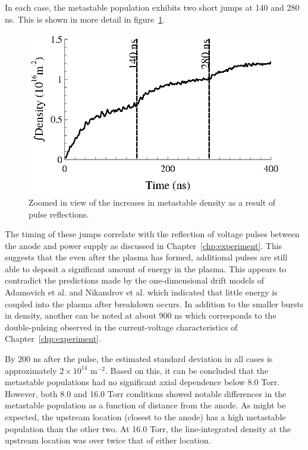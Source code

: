 In each case, the metastable population exhibits two short jumps at 140 and 280
ns. This is shown in more detail in figure~\ref{fig:mzoomed}.
\begin{figure}
  \centering
  \includegraphics{./chapters/metastables/figures/mzoomed.eps}
  \caption{Zoomed in view of the increases in metastable density as a result of
    pulse reflections.}
  \label{fig:mzoomed}
\end{figure}
The timing of these jumps correlate with the reflection of voltage pulses
between the anode and power supply as discussed in Chapter~\ref{chp:experiment}.
This suggests that the even after the plasma has formed, additional pulses are
still able to deposit a significant amount of energy in the plasma. This appears
to contradict the predictions made by the one-dimensional drift models of
Adamovich et al. \cite{Adamovich2009} and Nikandrov et al. \cite{Nikandrov2008}
which indicated that little energy is coupled into the plasma after breakdown
occurs. In addition to the smaller bursts in density, another can be noted at
about 900 ns which corresponds to the double-pulsing observed in the
current-voltage characteristics of Chapter~\ref{chp:experiment}.

By 200 ns after the pulse, the estimated standard deviation in all cases is
approximately $2\times10^{14}$ m$^{-2}$. Based on this, it can be concluded that
the metastable populations had no significant axial dependence below 8.0 Torr.
However, both 8.0 and 16.0 Torr conditions showed notable differences in the
metastable population as a function of distance from the anode. As might be
expected, the upstream location (closest to the anode) has a high metastable
population than the other two. At 16.0 Torr, the line-integrated density at the
upstream location was over twice that of either location.

